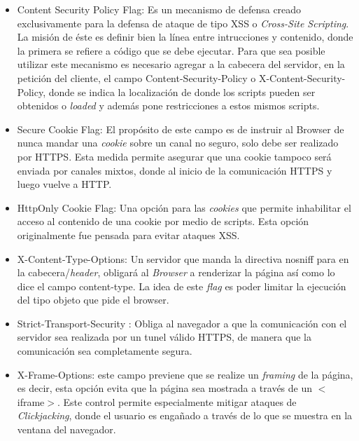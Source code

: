         \begin{itemize}
            \item Content Security Policy Flag: Es un mecanismo de defensa creado exclusivamente para la defensa de ataque de tipo XSS o \textit{Cross-Site Scripting}. La misión de éste es definir bien la línea entre intrucciones y contenido, donde la primera se refiere a código que se debe ejecutar. Para que sea posible utilizar este mecanismo es necesario agregar a la cabecera del servidor, en la petición del cliente, el campo Content-Security-Policy o X-Content-Security-Policy, donde se indica la localización de donde los scripts pueden ser obtenidos o \textit{loaded} y además pone restricciones a estos mismos scripts.

            \item Secure Cookie Flag: El propósito de este campo es de instruir al Browser de nunca mandar una \textit{cookie} sobre un canal no seguro, solo debe ser realizado por HTTPS. Esta medida permite asegurar que una cookie tampoco será enviada por canales mixtos, donde al inicio de la comunicación HTTPS y luego vuelve a HTTP.

            \item HttpOnly Cookie Flag: Una opción para las \textit{cookies} que permite inhabilitar el acceso al contenido de una cookie por medio de scripts. Esta opción originalmente fue pensada para evitar ataques XSS.

            \item X-Content-Type-Options: Un servidor que manda la directiva nosniff para en la cabecera/\textit{header}, obligará al \textit{Browser} a renderizar la página así como lo dice el campo content-type. La idea de este \textit{flag} es poder limitar la ejecución del tipo objeto que pide el browser.

            \item Strict-Transport-Security \cite{RFC-6797}: Obliga al navegador a que la comunicación con el servidor sea realizada por un tunel válido HTTPS, de manera que la comunicación sea completamente segura.

            \item X-Frame-Options: este campo previene que se realize un \textit{framing} de la página, es decir, esta opción evita que la página sea mostrada a través de un \(<\)iframe\(>\). Este control permite especialmente mitigar ataques de \textit{Clickjacking}, donde el usuario es engañado a través de lo que se muestra en la ventana del navegador.
        \end{itemize}

